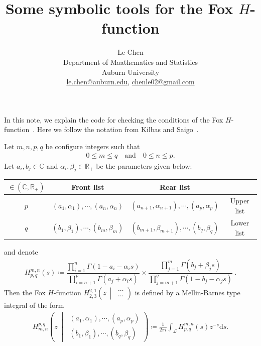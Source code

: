 \documentclass[11pt]{article}
\newcommand{\R}{\mathbb{R}}
\newcommand{\ud}{\ensuremath{\mathrm{d}}}
\newcommand{\FoxH}[5]{H_{#2}^{#1}\left(#3\:\middle\vert\: \begin{array}{l}#4\\[0.4em] #5\end{array}\right)}
\renewcommand{\arraystretch}{1.8}
\begin{document}
\title{Some symbolic tools for the {F}ox {$H$}-function}
\author{Le Chen                             \\
  Department of Maathematics and Statistics \\
  Auburn University                         \\
\url{le.chen@auburn.edu}, \url{chenle02@gmail.com}
}

\maketitle

In this note, we explain the code for checking the conditions of the Fox
$H$-function~\cite{fox:61:g}. Here we follow the notation from Kilbas and
Saigo~\cite{kilbas.saigo:04:h-transforms}. \bigskip


Let $m,n,p,q$ be configure integers such that
\begin{align*}
  0 \le m \le q \quad \text{and} \quad
  0 \le n \le p.
\end{align*}
Let $a_i,b_j\in \mathbb{C}$ and $\alpha_i, \beta_j \in\R_+$ be the parameters given below:
\begin{center}
\renewcommand{\arraystretch}{1.2}
  \begin{tabular}{|c|cc|c|}
    \hline
    $\in \left(\mathbb{C},\R_+\right)$ & Front list                              & Rear list                                       &            \\ \hline
    $p$                                & $(a_1,\alpha_1),\cdots, (a_n,\alpha_n)$ & $(a_{n+1},\alpha_{n+1}),\cdots, (a_p,\alpha_p)$ & Upper list \\
    $q$                                & $(b_1,\beta_1),\cdots, (b_m,\beta_m)$   & $(b_{m+1},\beta_{m+1}),\cdots, (b_q,\beta_q)$   & Lower list \\ \hline
  \end{tabular}
\end{center}
and denote
\begin{align}\label{E:H}
  H^{m,n}_{p,q}(s) \coloneqq
         \dfrac{ \displaystyle \prod_{i=1}^n\Gamma\left(1-a_i-\alpha_is\right) }{ \displaystyle \prod_{i=n+1}^p\Gamma\left(a_j+\alpha_is\right)    }
  \times \dfrac{ \displaystyle \prod_{j=1}^m\Gamma\left(b_j+\beta_js\right)    }{ \displaystyle \prod_{j=m+1}^q\Gamma\left(1- b_j-\alpha_js\right) }\:.
\end{align}
Then the Fox $H$-function $\FoxH{2,1}{2,3}{z}{\cdots}{\cdots}$ is defined by a Mellin-Barnes type integral of the form
\begin{align}\label{E:Fox-H}
  \FoxH{p,q}{m,n}{z}{(a_1,\alpha_1),\cdots, (a_p,\alpha_p)}{(b_1,\beta_1),\cdots, (b_q,\beta_q)}
  \coloneqq \frac{1}{2\pi i} \int_{\mathcal{L}} H^{m,n}_{p,q}(s) z^{-s} \ud s.
\end{align}
\end{document}
